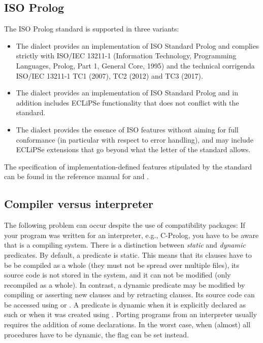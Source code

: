 \subsection{ISO Prolog}
The ISO Prolog standard \cite{isoprolog95} is supported in three variants:
\begin{itemize}
\item The  dialect
    provides an implementation of ISO Standard Prolog and complies
    strictly with ISO/IEC 13211-1 (Information Technology, Programming
    Languages, Prolog, Part 1, General Core, 1995) and the technical
    corrigenda ISO/IEC 13211-1 TC1 (2007), TC2 (2012) and TC3 (2017).
\item The  dialect provides
    an implementation of ISO Standard Prolog and in addition includes
    ECLiPSe functionality that does not conflict with the standard.
\item The  dialect
    provides the essence of ISO features without aiming for full
    conformance (in particular with respect to error handling), and
    may include ECLiPSe extensions that go beyond what the letter of
    the standard allows.
\end{itemize}
The specification of implementation-defined features stipulated
by the standard can be found in the reference manual for
 and
.


\subsection{Compiler versus interpreter}
The following problem can occur despite the use of compatibility packages:
If your program was written for an interpreter, e.g., C-Prolog,
you have to be aware that {\eclipse} is a compiling system.
There is a distinction between \emph{static} and \emph{dynamic} predicates.
By default, a predicate is static. This means that its clauses have to be
be compiled as a whole (they must not be spread over multiple files),
its source code is not stored in the system,
and it can not be modified (only recompiled as a whole).
In contrast, a dynamic predicate may be modified by compiling or
asserting new clauses and by retracting clauses.
Its source code can be accessed using
%
or
.%
A predicate is dynamic when it is explicitly declared as such or when
it was created using .
Porting programs from an interpreter usually requires the addition of
some  declarations.
In the worst case, when (almost) all procedures have to be dynamic,
the flag  can be set instead.


